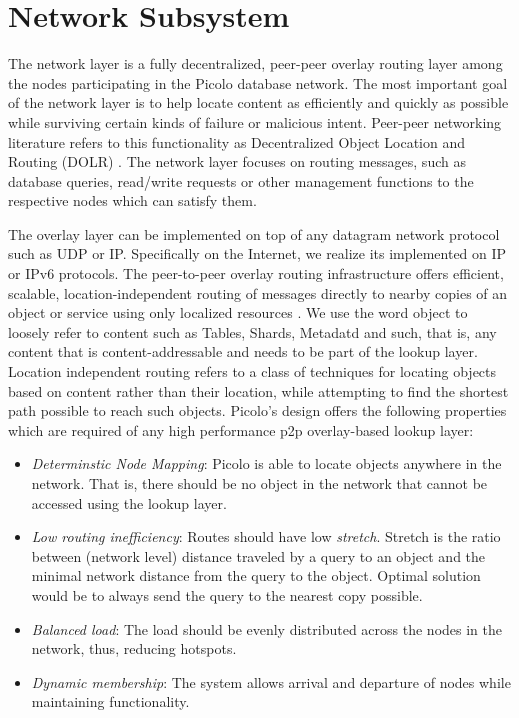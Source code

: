 \section{Network Subsystem} 

The network layer is a fully decentralized, peer-peer overlay routing layer among the nodes participating in the Picolo
database network. The most important goal of the network layer is to help locate content as efficiently and quickly as
possible while surviving certain kinds of failure or malicious intent. Peer-peer networking literature refers to this
functionality as Decentralized Object Location and Routing (DOLR) \cite{dolr2003}. The network layer focuses on routing
messages, such as database queries, read/write requests or other management functions to the respective nodes which can
satisfy them. 

The overlay layer can be implemented on top of any datagram network protocol such as UDP or IP. Specifically on the
Internet, we realize its implemented on IP or IPv6 protocols.  The peer-to-peer overlay routing infrastructure offers
efficient, scalable, location-independent routing of messages directly to nearby copies of an object or service using
only localized resources \cite{tapestry2004}. We use the word object to loosely refer to content such as Tables, Shards,
Metadatd and such, that is, any content that is content-addressable and needs to be part of the lookup layer.  Location
independent routing refers to a class of techniques for locating objects based on content rather than their location,
while attempting to find the shortest path possible to reach such objects. Picolo's design offers the following
properties which are required of any high performance p2p overlay-based lookup layer:

\begin{itemize}
    \item {\em Determinstic Node Mapping}: Picolo is able to locate objects anywhere in the network. That is, there
        should be no object in the network that cannot be accessed using the lookup layer.
    \item {\em Low routing inefficiency}: Routes should have low {\em stretch}. Stretch is the ratio between (network
        level) distance traveled by a query to an object and the minimal network distance from the query to the object.
        Optimal solution would be to always send the query to the nearest copy possible.
    \item {\em Balanced load}: The load should be evenly distributed across the nodes in the network, thus, reducing
        hotspots.
    \item {\em Dynamic membership}: The system allows arrival and departure of nodes while maintaining functionality.
\end{itemize}

